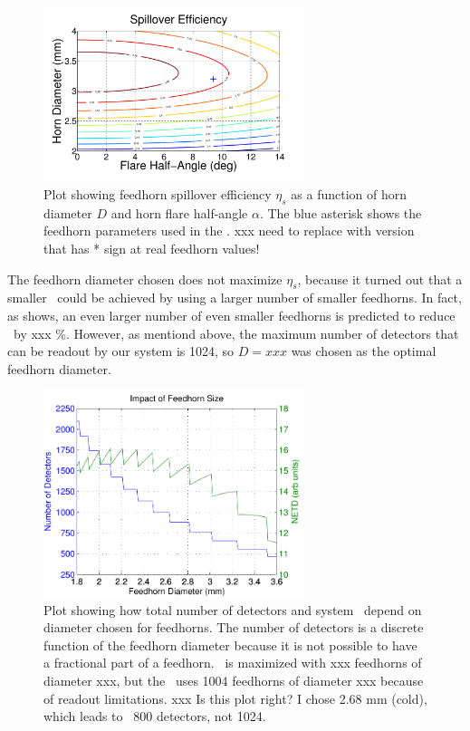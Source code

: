 \begin{figure}[th]
\centering
\includegraphics[width=3.0in]{./images/spill_vs_alpha_diam.pdf}
\caption{Plot showing feedhorn spillover efficiency $\eta_s$ as a function of horn diameter $D$ and horn flare half-angle $\alpha$. The blue asterisk shows the feedhorn parameters used in the \Imager. xxx need to replace with version that has * sign at real feedhorn values!}
\label{fig:spill-vs-alpha-diam}
\end{figure}

The feedhorn diameter chosen does not maximize $\eta_s$, because it turned out that a smaller \NETD\ could be achieved by using a larger number of smaller feedhorns.
In fact, as  shows, an even larger number of even smaller feedhorns is predicted to reduce \NETD\ by xxx \%.
However, as mentiond above, the maximum number of detectors that can be readout by our system is 1024, so $D = xxx$ was chosen as the optimal feedhorn diameter.

\begin{figure}[th]
\centering
\includegraphics[width=3.0in]{./images/netd_num_feeds.pdf}
\caption{Plot showing how total number of detectors and system \NETD\ depend on diameter chosen for feedhorns. The number of detectors is a discrete function of the feedhorn diameter because it is not possible to have a fractional part of a feedhorn. \NETD\ is maximized with xxx feedhorns of diameter xxx, but the \Imager\ uses 1004 feedhorns of diameter xxx because of readout limitations. xxx Is this plot right? I chose 2.68 mm (cold), which leads to ~800 detectors, not 1024.}
\label{fig:netd-num-feeds}
\end{figure}

